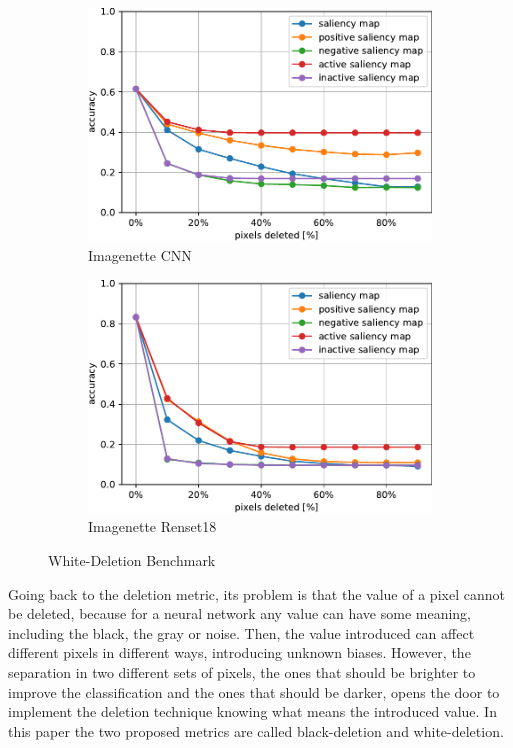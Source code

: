 \documentclass[preprint,12pt]{elsarticle}
\begin{document}
\begin{figure}[h]
\begin{subfigure}{0.49\textwidth}
        \includegraphics[width=\linewidth]{../visualizations/benchmarks/white_deletion/imagenette_cnn.pdf}
        \caption{Imagenette CNN}
    \end{subfigure}
    \hfill
    \begin{subfigure}{0.49\textwidth}
        \centering
        \includegraphics[width=\linewidth]{../visualizations/benchmarks/white_deletion/imagenette_resnet18.pdf}
        \caption{Imagenette Renset18}
    \end{subfigure}
    \caption{White-Deletion Benchmark}
    \label{fig: white-deletion benchmark}
\end{figure}

Going back to the deletion metric, its problem is that the value of a pixel cannot be deleted, because for a neural network any value can have some meaning, including the black, the gray or noise. Then, the value introduced can affect different pixels in different ways, introducing unknown biases. However, the separation in two different sets of pixels, the ones that should be brighter to improve the classification and the ones that should be darker, opens the door to implement the deletion technique knowing what means the introduced value. In this paper the two proposed metrics are called black-deletion and white-deletion.
\end{document}
